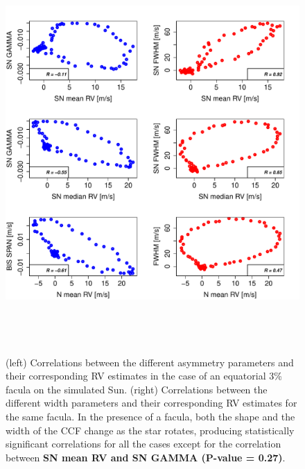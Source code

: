 \documentclass{aa}
\begin{document}
\begin{figure}[htbp]
\begin{center}
\includegraphics[height = 6in]{SOAP_FACULA_Comparison_para_SN_woithNoise.pdf} 
   \caption{(left) Correlations between the different asymmetry parameters and their corresponding RV estimates in the case of an equatorial 3\% facula on the simulated Sun. (right) Correlations between the different width parameters and their corresponding RV estimates for the same facula.
   In the presence of a facula, both the shape and the width of the CCF change as the star rotates, producing statistically significant correlations for all the cases except for the correlation between {\bf{SN mean RV and SN GAMMA (P-value = 0.27)}}.
   }
    \label{fig:faculae.corr}
\end{center}
\end{figure}
\end{document}
